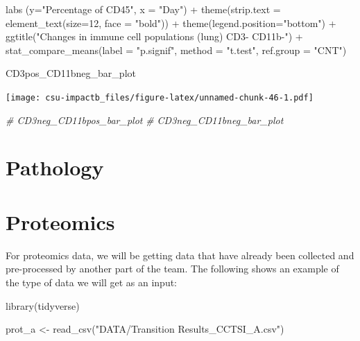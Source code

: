 \documentclass[
]{book}
\newenvironment{Shaded}{\begin{snugshade}}{\end{snugshade}}
\newcommand{\AttributeTok}[1]{\textcolor[rgb]{0.77,0.63,0.00}{#1}}
\newcommand{\CommentTok}[1]{\textcolor[rgb]{0.56,0.35,0.01}{\textit{#1}}}
\newcommand{\DecValTok}[1]{\textcolor[rgb]{0.00,0.00,0.81}{#1}}
\newcommand{\FunctionTok}[1]{\textcolor[rgb]{0.00,0.00,0.00}{#1}}
\newcommand{\NormalTok}[1]{#1}
\newcommand{\OtherTok}[1]{\textcolor[rgb]{0.56,0.35,0.01}{#1}}
\newcommand{\SpecialCharTok}[1]{\textcolor[rgb]{0.00,0.00,0.00}{#1}}
\newcommand{\StringTok}[1]{\textcolor[rgb]{0.31,0.60,0.02}{#1}}
\begin{document}
\begin{Shaded}
\begin{Highlighting}[]
  \FunctionTok{labs}\NormalTok{ (}\AttributeTok{y=}\StringTok{"Percentage of CD45"}\NormalTok{, }\AttributeTok{x =} \StringTok{"Day"}\NormalTok{) }\SpecialCharTok{+} 
  \FunctionTok{theme}\NormalTok{(}\AttributeTok{strip.text =} \FunctionTok{element\_text}\NormalTok{(}\AttributeTok{size=}\DecValTok{12}\NormalTok{, }\AttributeTok{face =} \StringTok{"bold"}\NormalTok{)) }\SpecialCharTok{+} \FunctionTok{theme}\NormalTok{(}\AttributeTok{legend.position=}\StringTok{"bottom"}\NormalTok{) }\SpecialCharTok{+}
  \FunctionTok{ggtitle}\NormalTok{(}\StringTok{"Changes in immune cell populations (lung) CD3{-} CD11b{-}"}\NormalTok{) }\SpecialCharTok{+}
  \FunctionTok{stat\_compare\_means}\NormalTok{(}\AttributeTok{label =} \StringTok{"p.signif"}\NormalTok{, }\AttributeTok{method =} \StringTok{"t.test"}\NormalTok{,}
                     \AttributeTok{ref.group =} \StringTok{"CNT"}\NormalTok{)}

\NormalTok{CD3pos\_CD11bneg\_bar\_plot}
\end{Highlighting}
\end{Shaded}

\texttt{[image: csu-impactb\_files/figure-latex/unnamed-chunk-46-1.pdf]}

\begin{Shaded}
\begin{Highlighting}[]
\CommentTok{\# CD3neg\_CD11bpos\_bar\_plot}
\CommentTok{\# CD3neg\_CD11bneg\_bar\_plot}
\end{Highlighting}
\end{Shaded}

\hypertarget{pathology}{%
\chapter{Pathology}\label{pathology}}

\hypertarget{proteomics}{%
\chapter{Proteomics}\label{proteomics}}

For proteomics data, we will be getting data that have already been collected and
pre-processed by another part of the team. The following shows an example of the
type of data we will get as an input:

\begin{Shaded}
\begin{Highlighting}[]
\FunctionTok{library}\NormalTok{(tidyverse)}

\NormalTok{prot\_a }\OtherTok{\textless{}{-}} \FunctionTok{read\_csv}\NormalTok{(}\StringTok{"DATA/Transition Results\_CCTSI\_A.csv"}\NormalTok{)}
\end{Highlighting}
\end{Shaded}
\end{document}
